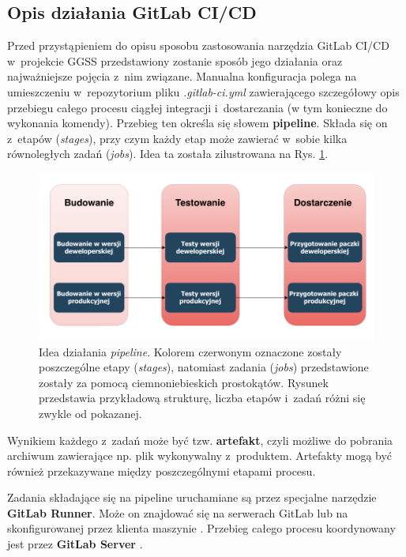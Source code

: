 \subsection{Opis działania GitLab CI/CD}
Przed przystąpieniem do opisu sposobu zastosowania narzędzia GitLab CI/CD w~projekcie GGSS przedstawiony zostanie sposób jego działania oraz najważniejsze pojęcia z~nim związane. Manualna konfiguracja polega na umieszczeniu w~repozytorium pliku \textit{.gitlab-ci.yml} zawierającego szczegółowy opis przebiegu całego procesu ciągłej integracji i~dostarczania (w tym konieczne do wykonania komendy). Przebieg ten określa się słowem \textbf{pipeline}. Składa się on z~etapów (\textit{stages}), przy czym każdy etap może zawierać w~sobie kilka równoległych zadań (\textit{jobs}). Idea ta została zilustrowana na Rys. \ref{fig:pipeline}.

\begin{figure}
\centering
\caption{Idea działania \textit{pipeline}. Kolorem czerwonym oznaczone zostały poszczególne etapy (\textit{stages}), natomiast zadania (\textit{jobs}) przedstawione zostały za pomocą ciemnoniebieskich prostokątów. Rysunek przedstawia przykładową strukturę, liczba etapów i~zadań różni się zwykle od pokazanej.}
\label{fig:pipeline}
\includegraphics[width=\textwidth]{res/Pipeline.pdf}
\end{figure}

Wynikiem każdego z~zadań może być tzw. \textbf{artefakt}, czyli możliwe do pobrania archiwum zawierające np. plik wykonywalny z~produktem. Artefakty mogą być również przekazywane między poszczególnymi etapami procesu. 

Zadania składające się na pipeline uruchamiane są przez specjalne narzędzie \textbf{GitLab Runner}. Może on znajdować się na serwerach GitLab lub na skonfigurowanej przez klienta maszynie \cite{CIzGitLab}. Przebieg całego procesu koordynowany jest przez \textbf{GitLab Server} \cite{GitLabPage}.

